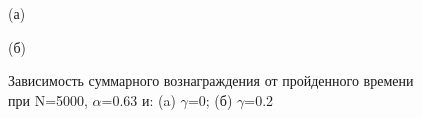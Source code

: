 \documentclass[a4paper]{report}
\theoremstyle{definition}
\theoremstyle{plain}
\theoremstyle{remark}
\theoremstyle{remark}
\theoremstyle{definition}
\begin{document}
\begin{figure}[H]
    \begin{minipage}[H]{0.49\linewidth}
        (а)\\
    \end{minipage}
    \hfill
    \begin{minipage}[H]{0.49\linewidth}
        (б)\\
    \end{minipage}
    \caption{Зависимость суммарного вознаграждения от пройденного времени при N=5000, $\alpha$=0.63 и: (a) $\gamma$=0; (б) $\gamma$=0.2}
\end{figure}
\end{document}
